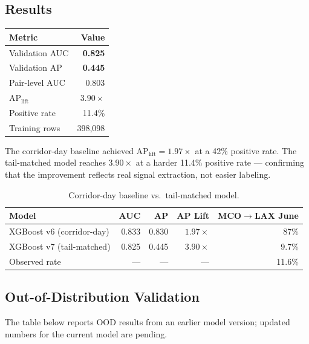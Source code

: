 \documentclass[11pt, twoside]{article}
\begin{document}
\subsection{Results}

\begin{resultbox}[title=Validation Results (2024 Holdout)]
\begin{center}
\begin{tabular}{lr}
\toprule
Metric & Value \\
\midrule
Validation AUC & \textbf{0.825} \\
Validation AP & \textbf{0.445} \\
Pair-level AUC & 0.803 \\
$\mathrm{AP}_{\text{lift}}$ & $3.90\times$ \\
Positive rate & 11.4\% \\
Training rows & 398,098 \\
\bottomrule
\end{tabular}
\end{center}
\end{resultbox}

The corridor-day baseline achieved $\mathrm{AP}_{\text{lift}} = 1.97\times$
at a 42\% positive rate.  The tail-matched model reaches $3.90\times$ at a
harder 11.4\% positive rate --- confirming that the improvement reflects real
signal extraction, not easier labeling.

\begin{table}[H]
\centering
\caption{Corridor-day baseline vs.\ tail-matched model.}
\label{tab:model_comparison}
\begin{tabular}{lrrrr}
\toprule
Model & AUC & AP & AP Lift & MCO$\to$LAX June \\
\midrule
XGBoost v6 (corridor-day) & 0.833 & 0.830 & $1.97\times$ & 87\% \\
XGBoost v7 (tail-matched) & 0.825 & 0.445 & $3.90\times$ & 9.7\% \\
Observed rate & --- & --- & --- & 11.6\% \\
\bottomrule
\end{tabular}
\end{table}

\subsection{Out-of-Distribution Validation}

The table below reports OOD results from an earlier model version; updated
numbers for the current model are pending.
\end{document}
